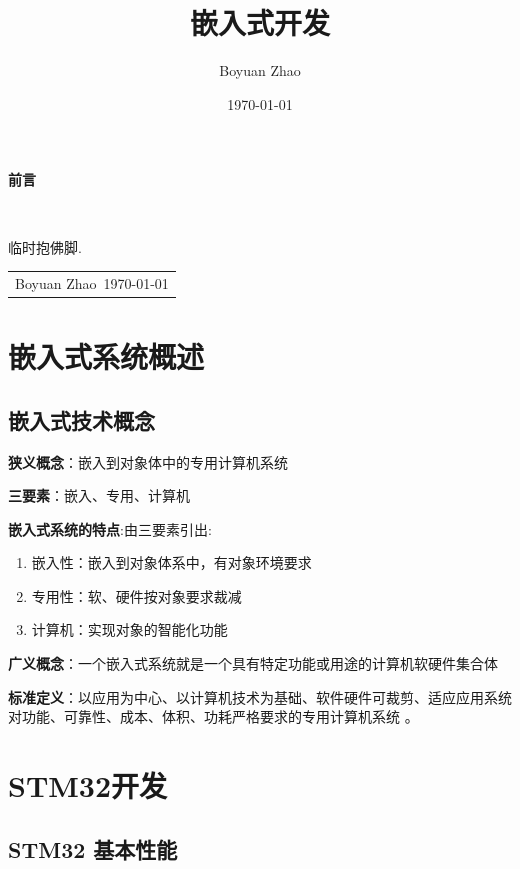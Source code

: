 \documentclass[12pt, a4paper, oneside]{ctexbook}
\title{{\Huge{\textbf{嵌入式开发}}}}
\author{Boyuan Zhao}
\date{\today}
\numberwithin{figure}{section}
\begin{document}
\maketitle

\setcounter{page}{1}

\begin{center}
    \Huge\textbf{前言}
\end{center}~\

临时抱佛脚. 
~\
\begin{flushright}
    \begin{tabular}{c}
        Boyuan Zhao\
        \today
    \end{tabular}
\end{flushright}

\newpage
{}
\setcounter{page}{1}
\tableofcontents

\newpage
\setcounter{page}{1}

\chapter{嵌入式系统概述}
\section{嵌入式技术概念}
\textbf{狭义概念}：嵌入到对象体中的专用计算机系统

\textbf{三要素}：嵌入、专用、计算机

\textbf{嵌入式系统的特点}:由三要素引出:
    \begin{enumerate}
        \item 嵌入性：嵌入到对象体系中，有对象环境要求
        \item 专用性：软、硬件按对象要求裁减
        \item 计算机：实现对象的智能化功能
    \end{enumerate}

\textbf{广义概念}：一个嵌入式系统就是一个具有特定功能或用途的计算机软硬件集合体

\textbf{标准定义}：以应用为中心、以计算机技术为基础、软件硬件可裁剪、适应应用系统对功能、可靠性、成本、体积、功耗严格要求的专用计算机系统 。
\chapter{STM32开发}
 

\section{STM32 基本性能}
\end{document}
